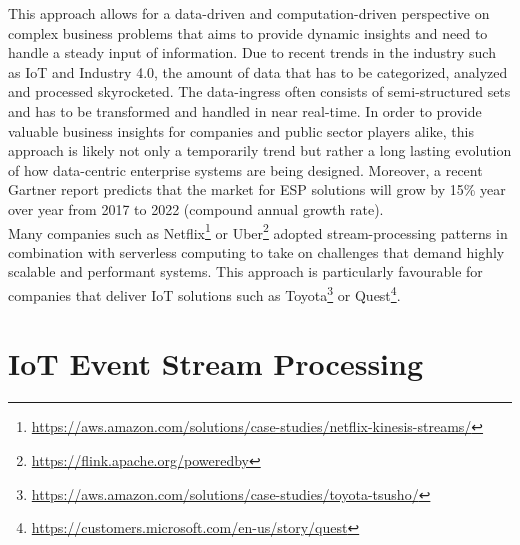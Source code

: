 \begin{enumerate}
    This approach allows for a data-driven and computation-driven perspective on complex business problems that aims to provide dynamic insights and need to handle a steady input of information. 
    Due to recent trends in the industry such as IoT and Industry 4.0, the amount of data that has to be categorized, analyzed and processed skyrocketed. The data-ingress often consists of semi-structured sets and has to be transformed and handled in near real-time.\autocite{Dekate2017PredictsInfrastructure} In order to provide valuable business insights for companies and public sector players alike, this approach is likely not only a temporarily trend but rather a long lasting evolution of how data-centric enterprise systems are being designed. Moreover, a recent Gartner report predicts that the market for \acf{ESP} solutions will grow by 15\% year over year from 2017 to 2022 (compound annual growth rate).\autocite{Heudecker2017MarketProcessing} \\
    Many companies such as Netflix\footnote{\url{https://aws.amazon.com/solutions/case-studies/netflix-kinesis-streams/}} or Uber\footnote{\url{https://flink.apache.org/poweredby}} adopted stream-processing patterns in combination with serverless computing to take on challenges that demand highly scalable and performant systems. 
    This approach is particularly favourable for companies that deliver IoT solutions such as Toyota\footnote{\url{https://aws.amazon.com/solutions/case-studies/toyota-tsusho/}} or Quest\footnote{\url{https://customers.microsoft.com/en-us/story/quest}}.
    
\end{enumerate}


\section{IoT Event Stream Processing}


